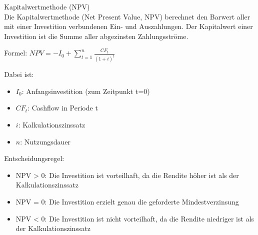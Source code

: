 \begin{definition}{Kapitalwertmethode (NPV)}\\
Die Kapitalwertmethode (Net Present Value, NPV) berechnet den Barwert aller mit einer Investition verbundenen Ein- und Auszahlungen. Der Kapitalwert einer Investition ist die Summe aller abgezinsten Zahlungsströme.

Formel: $NPV = -I_0 + \sum_{t=1}^{n} \frac{CF_t}{(1 + i)^t}$

Dabei ist:
\begin{itemize}
    \item $I_0$: Anfangsinvestition (zum Zeitpunkt t=0)
    \item $CF_t$: Cashflow in Periode t
    \item $i$: Kalkulationszinssatz
    \item $n$: Nutzungsdauer
\end{itemize}

Entscheidungsregel:
\begin{itemize}
    \item NPV > 0: Die Investition ist vorteilhaft, da die Rendite höher ist als der Kalkulationszinssatz
    \item NPV = 0: Die Investition erzielt genau die geforderte Mindestverzinsung
    \item NPV < 0: Die Investition ist nicht vorteilhaft, da die Rendite niedriger ist als der Kalkulationszinssatz
\end{itemize}
\end{definition}

